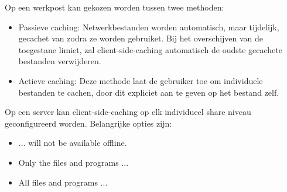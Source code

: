 \begin{enumerate}
{\begin{itemize}
                Op een werkpost kan gekozen worden tussen twee methoden:
                \begin{itemize}
                    \item Passieve caching: Netwerkbestanden worden automatisch, maar tijdelijk, gecachet van zodra ze worden gebruiket. Bij het overschijven van de toegestane limiet, zal client-side-caching automatisch de oudste gecachete bestanden verwijderen.
                    \item Actieve caching: Deze methode laat de gebruiker toe om individuele bestanden te cachen, door dit expliciet aan te geven op het bestand zelf.
                \end{itemize}

                Op een server kan client-side-caching op elk individueel share niveau geconfigureerd worden. Belangrijke opties zijn:
                \begin{itemize}
                    \item ... will not be available offline.
                    \item Only the files and programs ...
                    \item All files and programs ...
                \end{itemize}
			
			\end{itemize}
		}
		
		 { }
		

\end{enumerate}
